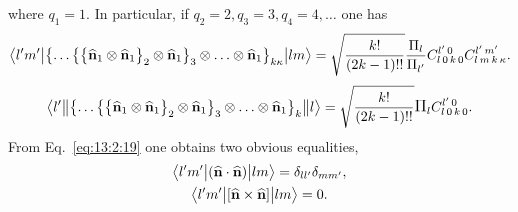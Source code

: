 where \(q_{1}=1\). In particular, if \(q_{2}=2, q_{3}=3, q_{4}=4, \ldots\) one has
\begin{equation}
\braOket{ l^{\prime} m^{\prime}}{\bigl\{\ldots\bigl\{\bigl\{\widehat{\vect{n}}_{1} \otimes \widehat{\vect{n}}_{1}\bigr\}_{2} \otimes \widehat{\vect{n}}_{1}\bigr\}_{3} \otimes \ldots \otimes \widehat{\vect{n}}_{1}\bigr\}_{k \kappa}}{l m}=\sqrt{\frac{k!}{(2 k-1)!!}} \frac{\Fact{l}}{\Fact{l^{\prime}}}
\clebsch{l}{0}{k}{0}{l^{\prime}}{0} 
\clebsch{l}{m}{k}{\kappa}{l^{\prime}}{m^{\prime}}. \label{eq:13:2:20}
\end{equation}
\begin{equation*}
\braOketred{ l^{\prime}}{\bigl\{\ldots\bigl\{\bigl\{\widehat{\vect{n}}_{1} \otimes \widehat{\vect{n}}_{1}\bigr\}_{2} \otimes \widehat{\vect{n}}_{1}\bigr\}_{3} \otimes \ldots \otimes \widehat{\vect{n}}_{1}\bigr\}_{k}}{ l}=\sqrt{\frac{k!}{(2 k-1)!!}}
\Fact{l} %
\clebsch{l}{0}{k}{0}{l^{\prime}}{0}.
\end{equation*}
From Eq.~\eqref{eq:13:2:19} one obtains two obvious equalities,
\begin{gather*}
\bigl\langle  l^{\prime} m^{\prime} \big| (\widehat{\mathbf{n}} \cdot \widehat{\mathbf{n}}) \big| l m \bigr\rangle=\delta_{l l^{\prime}} \delta_{m m^{\prime}} ,\\
\bigl\langle  l^{\prime} m^{\prime} \big| [\widehat{\mathbf{n}} \times \widehat{\mathbf{n}}] \big| l m \bigr\rangle=0.
\end{gather*}

